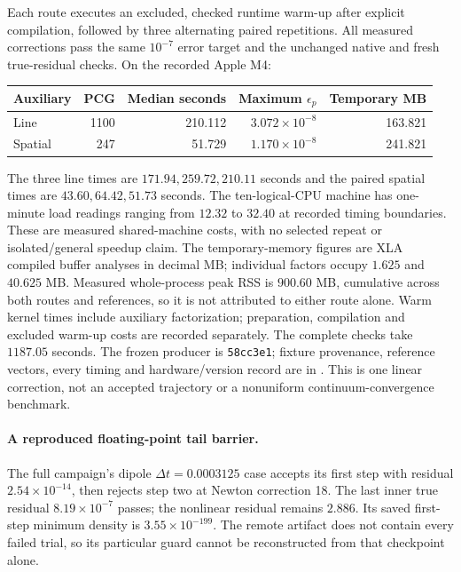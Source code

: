 \documentclass[11pt,letterpaper]{article}
\begin{document}
Each route executes an excluded, checked runtime warm-up after explicit
compilation, followed by three alternating paired repetitions. All measured
corrections pass the same $10^{-7}$ error target and the unchanged native
and fresh true-residual checks. On the recorded Apple M4:
\begin{center}
\begin{tabular}{lrrrr}
\toprule
Auxiliary & PCG & Median seconds & Maximum $\epsilon_p$ & Temporary MB\\
\midrule
Line &1100&210.112&$3.072\times10^{-8}$&163.821\\
Spatial &247&51.729&$1.170\times10^{-8}$&241.821\\
\bottomrule
\end{tabular}
\end{center}
The three line times are $171.94,259.72,210.11$ seconds and the paired
spatial times are $43.60,64.42,51.73$ seconds. The ten-logical-CPU machine
has one-minute load readings ranging from $12.32$ to $32.40$ at recorded
timing boundaries. These are measured shared-machine costs, with no selected
repeat or isolated/general speedup claim. The temporary-memory figures are
XLA compiled buffer analyses in decimal MB; individual factors occupy
$1.625$ and $40.625$ MB. Measured whole-process peak RSS is $900.60$ MB,
cumulative across both routes and references, so it is not attributed to
either route alone. Warm kernel times include auxiliary factorization;
preparation, compilation and excluded warm-up costs are recorded separately.
The complete checks take $1187.05$ seconds. The frozen producer is
\texttt{58cc3e1}; fixture provenance, reference vectors, every timing and
hardware/version record are in .
This is one linear correction, not an accepted trajectory or a nonuniform
continuum-convergence benchmark.

\paragraph{A reproduced floating-point tail barrier.}
The full campaign's dipole $\Delta t=0.0003125$ case accepts its first step
with residual $2.54\times10^{-14}$, then rejects step two at Newton
correction 18. The last inner true residual $8.19\times10^{-7}$ passes;
the nonlinear residual remains $2.886$. Its saved first-step minimum density
is $3.55\times10^{-199}$. The remote artifact does not contain every failed
trial, so its particular guard cannot be reconstructed from that checkpoint
alone.
\end{document}
